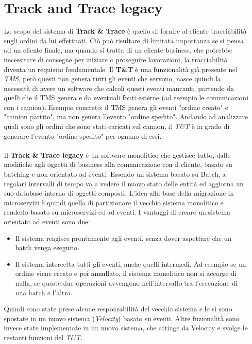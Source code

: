 \section{Track and Trace legacy}
\label{sec:T&T_old}
Lo scopo del sistema di \textbf{Track \& Trace}  è quello di fornire al cliente tracciabilità sugli ordini da lui effettuati.
Ciò può risultare di limitata importanza se si pensa ad un cliente finale, ma quando si tratta di un cliente business,
che potrebbe necessitare di consegne per iniziare o proseguire lavorazioni, la tracciabilità diventa un requisito fondamentale.
Il \textbf{T\&T} è una funzionalità già presente nel \textit{TMS}, però questi non genera tutti gli eventi che servono,
nasce quindi la necessità di avere un software che calcoli questi eventi mancanti, partendo da quelli che il TMS genera e da eventuali fonti esterne (ad esempio le comunicazioni con i camion). 
Esempio concreto: il TMS genera gli eventi "ordine creato" e "camion partito", ma non genera l'evento "ordine spedito". 
Andando ad analizzare quali sono gli ordini che sono stati caricati sul camion, il \textit{T\&T} è in grado di generare l'evento "ordine spedito" per ognuno di essi.
\\\\
Il \textbf{Track \& Trace legacy} è un software monolitico che gestisce tutto, dalle modifiche agli oggetti di business alla comunicazione con il cliente, basato su batching e non orientato ad eventi.
Essendo un sistema basato su Batch, a regolari intervalli di tempo va a vedere il nuovo stato delle entità ed aggiorna un suo database interno di oggetti composti.
L'idea alla base della migrazione in microservizi è quindi quella di partizionare il vecchio sistema monolitico e renderlo basato su microservizi ed ad eventi.
I vantaggi di creare un sistema orientato ad eventi sono due:
\begin{itemize}
    \item Il sistema reagisce prontamente agli eventi, senza dover aspettare che un batch venga eseguito.
    \item Il sistema intercetta tutti gli eventi, anche quelli intermedi. Ad esempio se un ordine viene creato e poi annullato, il sistema monolitico non si accorge di nulla, se queste due operazioni avvengono nell'intervallo tra l'esecuzione di una batch e l'altra. 
\end{itemize}
Quindi sono state prese alcune responsabilità del vecchio sistema e le si sono spostate in un nuovo sistema (\textit{Velocity}) basato su eventi.
Altre fuzionalità sono invece state implementate in un nuovo sistema, che attinge da Velocity e svolge le restanti funzioni del \textit{T\&T}.
